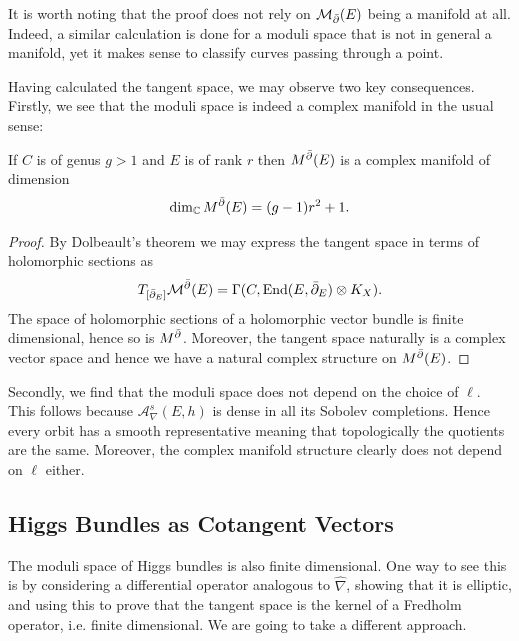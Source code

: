 \documentclass[12pt]{ociamthesis}  %
\begin{document}
It is worth noting that the proof does not rely on $\mathcal M_{\bar{\partial}}(E)$ being a manifold
at all. Indeed, a similar calculation is done for a moduli space that is not
in general a manifold, yet it makes sense to classify curves passing through a point.

Having calculated the tangent space, we may observe two key consequences.
Firstly, we see that the moduli space is indeed a complex manifold in the usual sense:

\begin{corollary}
  If $C$ is of genus $g>1$ and $E$ is of rank $r$ then
  $M^{\bar{\partial}}(E)$ is a complex manifold of dimension
  \begin{align*}
    \dim_{\mathbb{C}} M^{\bar{\partial}}(E) = (g-1)r^2 + 1.
  \end{align*}
  \begin{proof}
    By Dolbeault's theorem we may express the tangent space in terms of holomorphic
    sections as
    \begin{align*}
      T_{[{\bar{\partial}}_E]}\mathcal M^{\bar{\partial}}(E) = \Gamma(C,\operatorname{End}(E,{\bar{\partial}}_E) \otimes K_X).
    \end{align*}
    The space of holomorphic sections of a holomorphic vector bundle is finite dimensional,
    hence so is $M^{\bar{\partial}}$. Moreover, the tangent space naturally is a complex vector
    space and hence we have a natural complex structure on $M^{\bar{\partial}}(E)$.

  \end{proof}
\end{corollary}

Secondly, we find that the moduli space does not depend on the
choice of $\ell$. This follows because $\mathcal A_\nabla^{s}(E,h)$
is dense in all its Sobolev completions. Hence every orbit has a
smooth representative meaning that topologically the quotients are
the same. Moreover, the complex manifold structure clearly
does not depend on $\ell$ either.

\subsection{Higgs Bundles as Cotangent Vectors}

The moduli space of Higgs bundles is also finite dimensional. One way to
see this is by considering a differential operator analogous to $\hat\nabla$,
showing that it is elliptic, and using this to prove that the
tangent space is the kernel of a Fredholm operator, i.e. finite
dimensional. We are going to take a different approach.
\end{document}

